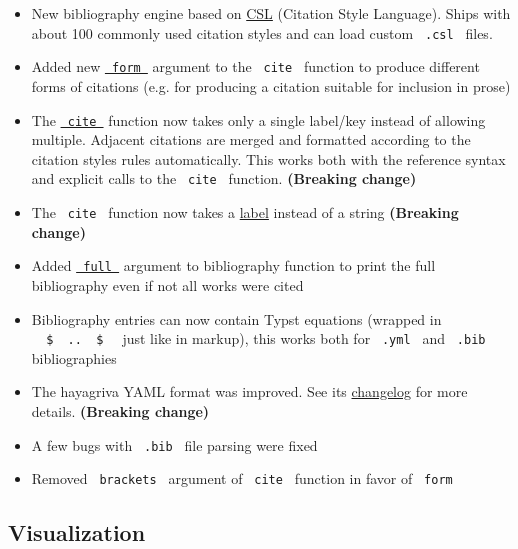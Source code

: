 \begin{itemize}
\tightlist
\item
  New bibliography engine based on
  \href{https://citationstyles.org/}{CSL} (Citation Style Language).
  Ships with about 100 commonly used citation styles and can load custom
  \texttt{\ .csl\ } files.
\item
  Added new
  \href{/docs/reference/model/cite/\#parameters-form}{\texttt{\ form\ }}
  argument to the \texttt{\ cite\ } function to produce different forms
  of citations (e.g. for producing a citation suitable for inclusion in
  prose)
\item
  The \href{/docs/reference/model/cite/}{\texttt{\ cite\ }} function now
  takes only a single label/key instead of allowing multiple. Adjacent
  citations are merged and formatted according to the citation
  style\textquotesingle s rules automatically. This works both with the
  reference syntax and explicit calls to the \texttt{\ cite\ } function.
  \textbf{(Breaking change)}
\item
  The \texttt{\ cite\ } function now takes a
  \href{/docs/reference/foundations/label/}{label} instead of a string
  \textbf{(Breaking change)}
\item
  Added
  \href{/docs/reference/model/bibliography/\#parameters-full}{\texttt{\ full\ }}
  argument to bibliography function to print the full bibliography even
  if not all works were cited
\item
  Bibliography entries can now contain Typst equations (wrapped in
  \texttt{\ }{\texttt{\ \$\ }}\texttt{\ ..\ }{\texttt{\ \$\ }}\texttt{\ }
  just like in markup), this works both for \texttt{\ .yml\ } and
  \texttt{\ .bib\ } bibliographies
\item
  The hayagriva YAML format was improved. See its
  \href{https://github.com/typst/hayagriva/blob/main/CHANGELOG.md}{changelog}
  for more details. \textbf{(Breaking change)}
\item
  A few bugs with \texttt{\ .bib\ } file parsing were fixed
\item
  Removed \texttt{\ brackets\ } argument of \texttt{\ cite\ } function
  in favor of \texttt{\ form\ }
\end{itemize}

\subsection{Visualization}\label{visualization}

